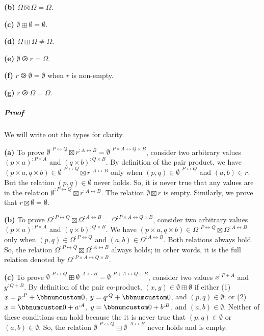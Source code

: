 \textbf{(b)} $\Omega\boxtimes\Omega=\Omega$.

\textbf{(c)} $\emptyset\boxplus\emptyset=\emptyset$.

\textbf{(d)} $\Omega\boxplus\Omega\neq\Omega$.

\textbf{(e)} $\emptyset\ogreaterthan r=\Omega$.

\textbf{(f)} $r\ogreaterthan\emptyset=\emptyset$ when $r$ is non-empty.

\textbf{(g)} $r\ogreaterthan\Omega=\Omega$.

\subparagraph{Proof}

We will write out the types for clarity.

\textbf{(a)} To prove $\emptyset^{:P\leftrightarrow Q}\boxtimes r^{:A\leftrightarrow B}=\emptyset^{:P\times A\leftrightarrow Q\times B}$,
consider two arbitrary values $(p\times a)^{:P\times A}$ and $(q\times b)^{:Q\times B}$.
By definition of the pair product, we have $(p\times a,q\times b)\in\emptyset^{:P\leftrightarrow Q}\boxtimes r^{:A\leftrightarrow B}$
only when $(p,q)\in\emptyset^{:P\leftrightarrow Q}$ and $(a,b)\in r$.
But the relation $(p,q)\in\emptyset$ never holds. So, it is never
true that any values are in the relation $\emptyset^{:P\leftrightarrow Q}\boxtimes r^{:A\leftrightarrow B}$.
The relation $\emptyset\boxtimes r$ is empty. Similarly, we prove
that $r\boxtimes\emptyset=\emptyset$.

\textbf{(b)} To prove $\Omega^{:P\leftrightarrow Q}\boxtimes\Omega^{:A\leftrightarrow B}=\Omega^{:P\times A\leftrightarrow Q\times B}$,
consider two arbitrary values $(p\times a)^{:P\times A}$ and $(q\times b)^{:Q\times B}$.
We have $(p\times a,q\times b)\in\Omega^{:P\leftrightarrow Q}\boxtimes\Omega^{:A\leftrightarrow B}$
only when $(p,q)\in\Omega^{:P\leftrightarrow Q}$ and $(a,b)\in\Omega^{:A\leftrightarrow B}$.
Both relations always hold. So, the relation $\Omega^{:P\leftrightarrow Q}\boxtimes\Omega^{:A\leftrightarrow B}$
always holds; in other words, it is the full relation denoted by $\Omega^{:P\times A\leftrightarrow Q\times B}$.

\textbf{(c)} To prove $\emptyset^{:P\leftrightarrow Q}\boxplus\emptyset^{:A\leftrightarrow B}=\emptyset^{:P+A\leftrightarrow Q+B}$,
consider two values $x^{:P+A}$ and $y^{:Q+B}$. By definition of
the pair co-product, $(x,y)\in\emptyset\boxplus\emptyset$ if either
(1) $x=p^{:P}+\bbnum 0$, $y=q^{:Q}+\bbnum 0$, and $(p,q)\in\emptyset$;
or (2) $x=\bbnum 0+a^{:A}$, $y=\bbnum 0+b^{:B}$, and $(a,b)\in\emptyset$.
Neither of these conditions can hold because the it is never true
that $(p,q)\in\emptyset$ or $(a,b)\in\emptyset$. So, the relation
$\emptyset^{:P\leftrightarrow Q}\boxplus\emptyset^{:A\leftrightarrow B}$
never holds and is empty.

